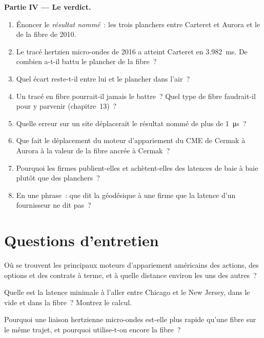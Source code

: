 \begin{problem}
\medskip\noindent\textbf{Partie IV --- Le verdict.}
\begin{enumerate}[resume]
\item Énoncer le \emph{résultat nommé}~: les trois planchers entre Carteret et Aurora et le  de la fibre de 2010.
\item Le tracé hertzien micro-ondes de 2016 a atteint Carteret en \qty{3.982}{\milli\second}. De combien a-t-il battu le plancher de la fibre~?
\item Quel écart reste-t-il entre lui et le plancher dans l'air~?
\item Un tracé en fibre pourrait-il jamais le battre~? Quel type de fibre faudrait-il pour y parvenir (chapitre~13)~?
\item Quelle erreur sur un site déplacerait le résultat nommé de plus de \qty{1}{\micro\second}~?
\item Que fait le déplacement du moteur d'appariement du CME de Cermak à Aurora à la valeur de la fibre ancrée à Cermak~?
\item Pourquoi les firmes publient-elles et achètent-elles des latences de baie à baie plutôt que des planchers~?
\item En une phrase~: que dit la géodésique à une firme que la latence d'un fournisseur ne dit pas~?
\end{enumerate}
\end{problem}

\section{Questions d'entretien}

\begin{interviewq}\label{iq:nw:the-north-american-map:1}
Où se trouvent les principaux moteurs d'appariement américains des actions, des options et des contrats à terme, et à quelle distance environ les uns des autres~?
\end{interviewq}

\begin{interviewq}\label{iq:nw:the-north-american-map:2}
Quelle est la latence minimale à l'aller entre Chicago et le New Jersey, dans le vide et dans la fibre~? Montrez le calcul.
\end{interviewq}

\begin{interviewq}\label{iq:nw:the-north-american-map:3}
Pourquoi une liaison hertzienne micro-ondes est-elle plus rapide qu'une fibre sur le même trajet, et pourquoi utilise-t-on encore la fibre~?
\end{interviewq}

